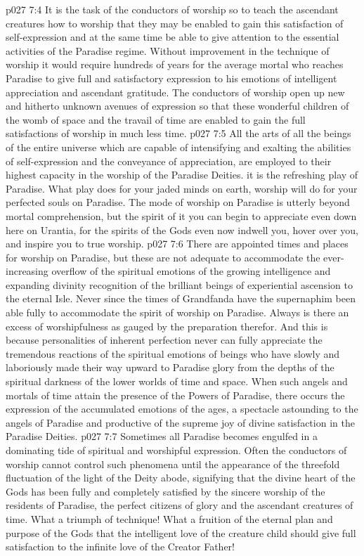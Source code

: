 \pc \vs p027 7:4 It is the task of the conductors of worship so to teach the ascendant creatures how to worship that they may be enabled to gain this satisfaction of self\hyp{}expression and at the same time be able to give attention to the essential activities of the Paradise regime. Without improvement in the technique of worship it would require hundreds of years for the average mortal who reaches Paradise to give full and satisfactory expression to his emotions of intelligent appreciation and ascendant gratitude. The conductors of worship open up new and hitherto unknown avenues of expression so that these wonderful children of the womb of space and the travail of time are enabled to gain the full satisfactions of worship in much less time.
\vs p027 7:5 All the arts of all the beings of the entire universe which are capable of intensifying and exalting the abilities of self\hyp{}expression and the conveyance of appreciation, are employed to their highest capacity in the worship of the Paradise Deities.  it is the refreshing play of Paradise. What play does for your jaded minds on earth, worship will do for your perfected souls on Paradise. The mode of worship on Paradise is utterly beyond mortal comprehension, but the spirit of it you can begin to appreciate even down here on Urantia, for the spirits of the Gods even now indwell you, hover over you, and inspire you to true worship.
\vs p027 7:6 There are appointed times and places for worship on Paradise, but these are not adequate to accommodate the ever\hyp{}increasing overflow of the spiritual emotions of the growing intelligence and expanding divinity recognition of the brilliant beings of experiential ascension to the eternal Isle. Never since the times of Grandfanda have the supernaphim been able fully to accommodate the spirit of worship on Paradise. Always is there an excess of worshipfulness as gauged by the preparation therefor. And this is because personalities of inherent perfection never can fully appreciate the tremendous reactions of the spiritual emotions of beings who have slowly and laboriously made their way upward to Paradise glory from the depths of the spiritual darkness of the lower worlds of time and space. When such angels and mortals of time attain the presence of the Powers of Paradise, there occurs the expression of the accumulated emotions of the ages, a spectacle astounding to the angels of Paradise and productive of the supreme joy of divine satisfaction in the Paradise Deities.
\vs p027 7:7 Sometimes all Paradise becomes engulfed in a dominating tide of spiritual and worshipful expression. Often the conductors of worship cannot control such phenomena until the appearance of the threefold fluctuation of the light of the Deity abode, signifying that the divine heart of the Gods has been fully and completely satisfied by the sincere worship of the residents of Paradise, the perfect citizens of glory and the ascendant creatures of time. What a triumph of technique! What a fruition of the eternal plan and purpose of the Gods that the intelligent love of the creature child should give full satisfaction to the infinite love of the Creator Father!
